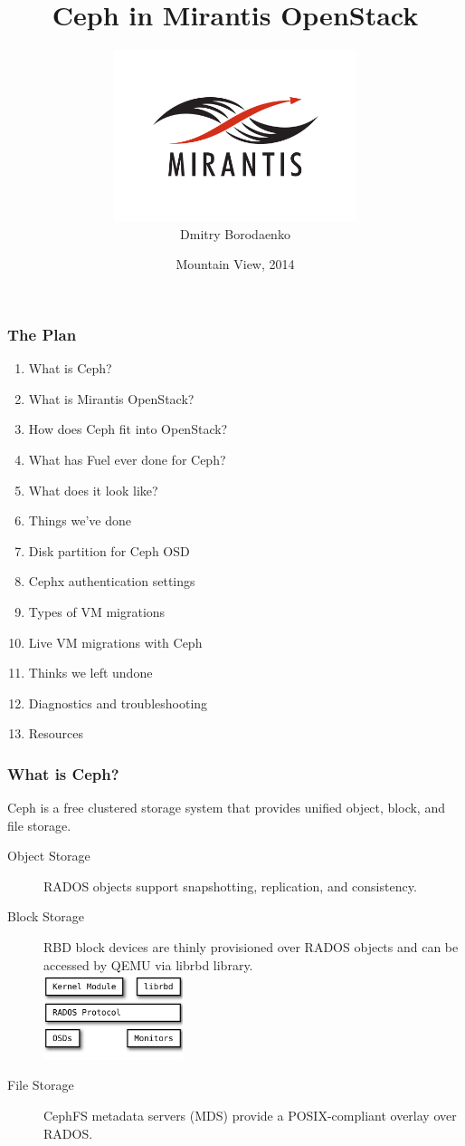 \documentclass[hyperref=unicode,utf8,xcolor=pst]{beamer}
\title{\fontsize{26}{0}\selectfont Ceph in Mirantis OpenStack}
\author{\vspace{-2.5mm}\includegraphics[height=5cm]{Vector_RGB_MirantisLogo}\\Dmitry Borodaenko}
\date{Mountain View, 2014}
\begin{document}
\begin{frame}
	\titlepage
\end{frame}

\begin{frame}
	\frametitle{The Plan}
	\begin{enumerate}
		\item What is Ceph?
		\item What is Mirantis OpenStack?
		\item How does Ceph fit into OpenStack?
		\item What has Fuel ever done for Ceph?
		\item What does it look like?
		\item Things we've done
		\item Disk partition for Ceph OSD
		\item Cephx authentication settings
		\item Types of VM migrations
		\item Live VM migrations with Ceph
		\item Thinks we left undone
		\item Diagnostics and troubleshooting
		\item Resources
	\end{enumerate}
\end{frame}

\begin{frame}
	\frametitle{What is Ceph?}
	Ceph is a free clustered storage system that provides unified
	object, block, and file storage.

	\begin{description}
		\item[Object Storage] RADOS objects support
			snapshotting, replication, and consistency.
		\item[Block Storage] RBD block devices are thinly
			provisioned over RADOS objects and can be
			accessed by QEMU via librbd library.\\
			\includegraphics[height=2.5cm]{ceph-rbd}
		\item[File Storage] CephFS metadata servers (MDS)
			provide a POSIX-compliant overlay over RADOS.
	\end{description}
\end{frame}
\end{document}
